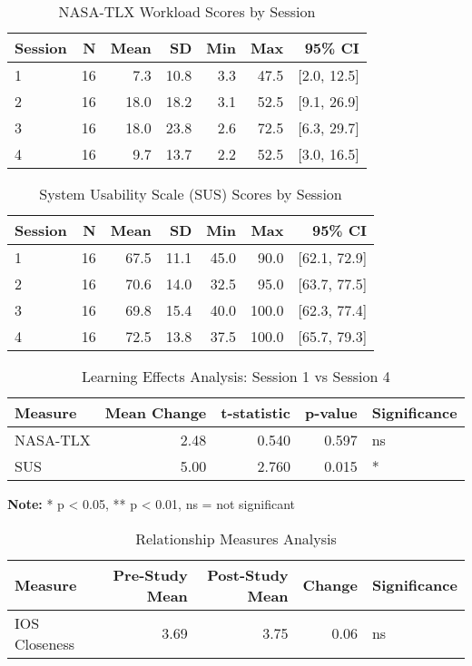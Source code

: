 \begin{table}[htbp]
\centering
\caption{NASA-TLX Workload Scores by Session}
\label{tab:nasa_tlx_by_session}
\begin{tabular}{lrrrrrr}
\toprule
\textbf{Session} & \textbf{N} & \textbf{Mean} & \textbf{SD} & \textbf{Min} & \textbf{Max} & \textbf{95\% CI} \\
\midrule
1 & 16 & 7.3 & 10.8 & 3.3 & 47.5 & [2.0, 12.5] \\
2 & 16 & 18.0 & 18.2 & 3.1 & 52.5 & [9.1, 26.9] \\
3 & 16 & 18.0 & 23.8 & 2.6 & 72.5 & [6.3, 29.7] \\
4 & 16 & 9.7 & 13.7 & 2.2 & 52.5 & [3.0, 16.5] \\
\bottomrule
\end{tabular}
\end{table}

\begin{table}[htbp]
\centering
\caption{System Usability Scale (SUS) Scores by Session}
\label{tab:sus_by_session}
\begin{tabular}{lrrrrrr}
\toprule
\textbf{Session} & \textbf{N} & \textbf{Mean} & \textbf{SD} & \textbf{Min} & \textbf{Max} & \textbf{95\% CI} \\
\midrule
1 & 16 & 67.5 & 11.1 & 45.0 & 90.0 & [62.1, 72.9] \\
2 & 16 & 70.6 & 14.0 & 32.5 & 95.0 & [63.7, 77.5] \\
3 & 16 & 69.8 & 15.4 & 40.0 & 100.0 & [62.3, 77.4] \\
4 & 16 & 72.5 & 13.8 & 37.5 & 100.0 & [65.7, 79.3] \\
\bottomrule
\end{tabular}
\end{table}

\begin{table}[htbp]
\centering
\caption{Learning Effects Analysis: Session 1 vs Session 4}
\label{tab:learning_effects}
\begin{tabular}{lrrrl}
\toprule
\textbf{Measure} & \textbf{Mean Change} & \textbf{t-statistic} & \textbf{p-value} & \textbf{Significance} \\
\midrule
NASA-TLX & 2.48 & 0.540 & 0.597 & ns \\
SUS & 5.00 & 2.760 & 0.015 & * \\
\bottomrule
\end{tabular}
\end{table}

\textbf{Note:} * p < 0.05, ** p < 0.01, ns = not significant

\begin{table}[htbp]
\centering
\caption{Relationship Measures Analysis}
\label{tab:relationship_measures}
\begin{tabular}{lrrrl}
\toprule
\textbf{Measure} & \textbf{Pre-Study Mean} & \textbf{Post-Study Mean} & \textbf{Change} & \textbf{Significance} \\
\midrule
IOS Closeness & 3.69 & 3.75 & 0.06 & ns \\
\bottomrule
\end{tabular}
\end{table}

